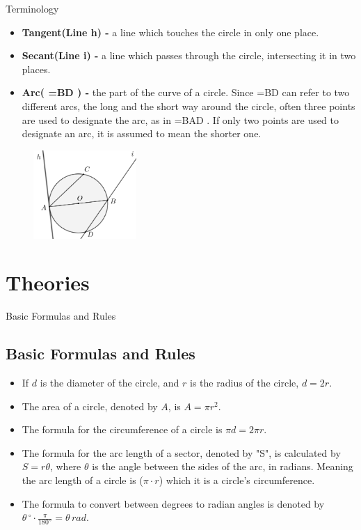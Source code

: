 \documentclass{beamer}
\newcommand{\arc}[1]{{%
		\setbox9=\hbox{#1}%
		\ooalign{\resizebox{\wd9}{\height}{\texttoptiebar{\phantom{A}}}\cr#1}}}
\begin{document}
	\begin{frame}{Terminology}
\begin{itemize}
	\item \textbf{Tangent(Line h) - } a line which touches the circle in only one place. 
	\item \textbf{Secant(Line i) - } a line which passes through the circle, intersecting it in two places.
	\item \textbf{Arc(\arc{BD}) - } the part of the curve of a circle. Since \arc{BD} can refer to two different arcs, the long and the short way around the circle, often three points are used to designate the arc, as in \arc{BAD}. 
	If only two points are used to designate an arc, it is assumed to mean the shorter one. \vspace{-5mm}
\end{itemize}
\begin{figure}[h!]
	\centering
	\includegraphics[width=0.35\textwidth]{Graphics/Week_13/GeometryDiagram.png}
	\label{fig: 2.1}
\end{figure}
\end{frame}

\section{Theories}
\normalsize
\begin{frame}{Basic Formulas and Rules}
\subsection{Basic Formulas and Rules}
\begin{itemize}
	\item If $d$ is the diameter of the circle, and $r$ is the radius of the circle, $d=2r$.
	\item The area of a circle, denoted by $A$, is $A=\pi r^2$.
	\item The formula for the circumference of a circle is $\pi d=2\pi r$.
	\item The formula for the arc length of a sector, denoted by "S", is calculated by $S=r\theta$, where $\theta$ is the angle between the sides of the arc, in radians. Meaning the arc length of a circle is ($\pi \cdot r$) which it is a circle's circumference.
	\item The formula to convert between degrees to radian angles is denoted by $\theta\,^{\circ}\cdot \frac{\pi}{180^{\,\circ}}=\theta \, rad$.
\end{itemize}
\end{frame}
\end{document}
